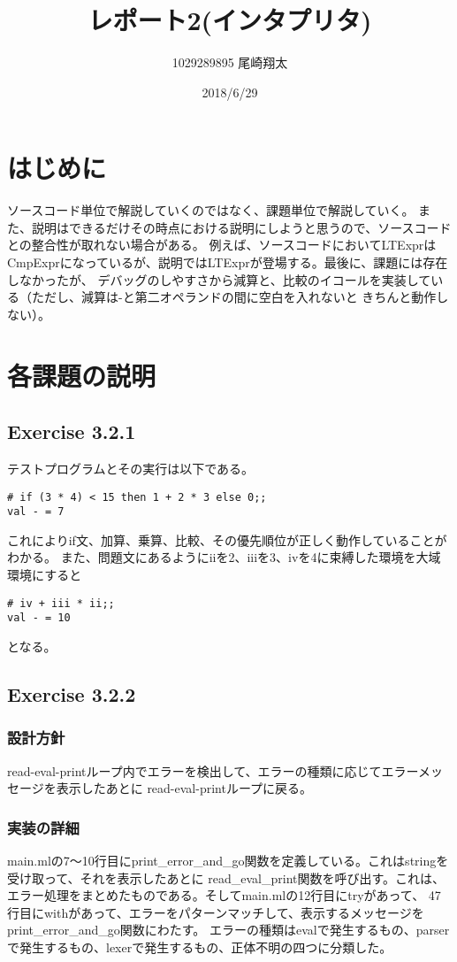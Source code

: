 \documentclass{jarticle}
\begin{document}
\title{レポート2(インタプリタ)}
\author{1029289895 尾崎翔太}
\date{2018/6/29}

\maketitle

\section{はじめに}
ソースコード単位で解説していくのではなく、課題単位で解説していく。
また、説明はできるだけその時点における説明にしようと思うので、ソースコードとの整合性が取れない場合がある。
例えば、ソースコードにおいてLTExprはCmpExprになっているが、説明ではLTExprが登場する。最後に、課題には存在しなかったが、
デバッグのしやすさから減算と、比較のイコールを実装している（ただし、減算は-と第二オペランドの間に空白を入れないと
きちんと動作しない）。

\section{各課題の説明}
\subsection{Exercise 3.2.1}
テストプログラムとその実行は以下である。
\begin{lstlisting}[basicstyle=\ttfamily\footnotesize, frame=single]
# if (3 * 4) < 15 then 1 + 2 * 3 else 0;;
val - = 7
\end{lstlisting}
これによりif文、加算、乗算、比較、その優先順位が正しく動作していることがわかる。
また、問題文にあるようにiiを2、iiiを3、ivを4に束縛した環境を大域環境にすると
\begin{lstlisting}[basicstyle=\ttfamily\footnotesize, frame=single]
# iv + iii * ii;;
val - = 10
\end{lstlisting}
となる。

\subsection{Exercise 3.2.2}
\subsubsection{設計方針}
read-eval-printループ内でエラーを検出して、エラーの種類に応じてエラーメッセージを表示したあとに
read-eval-printループに戻る。

\subsubsection{実装の詳細}
main.mlの7〜10行目にprint\_error\_and\_go関数を定義している。これはstringを受け取って、それを表示したあとに
read\_eval\_print関数を呼び出す。これは、エラー処理をまとめたものである。そしてmain.mlの12行目にtryがあって、
47行目にwithがあって、エラーをパターンマッチして、表示するメッセージをprint\_error\_and\_go関数にわたす。
エラーの種類はevalで発生するもの、parserで発生するもの、lexerで発生するもの、正体不明の四つに分類した。
\end{document}
